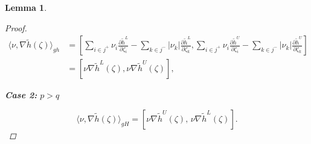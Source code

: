 \documentclass[12pt, reqno]{amsart}
\newtheorem{lemma}{Lemma}[section]
\theoremstyle{definition}
\theoremstyle{remark}
\numberwithin{equation}{section}
\begin{document}
\begin{lemma}
\begin{proof}
\begin{equation*}
    \begin{aligned}
        \langle \mathit{\nu}, \nabla\tilde{h}(\mathit{\zeta}) \rangle_{gh}
&= \left[
\sum_{i \in j^+} \mathit{\nu}_i \frac{\partial \tilde{h}^L}{\partial \mathit{\zeta}_i} - \sum_{k \in j^-} |\mathit{\nu}_k| \frac{\partial \tilde{h}^L}{\partial \mathit{\zeta}_k},\sum_{i \in j^+} \mathit{\nu}_i \frac{\partial \tilde{h}^U}{\partial \mathit{\zeta}_i} - \sum_{k \in j^-} |\mathit{\nu}_k| \frac{\partial \tilde{h}^U}{\partial \mathit{\zeta}_k}
\right]\\
&= [\mathit{\nu}\nabla\tilde{h}^L(\mathit{\zeta}),\mathit{\nu}\nabla\tilde{h}^U(\mathit{\zeta})],
    \end{aligned}
\end{equation*}

\textbf{Case 2:} \( p > q \)

\[
\langle \mathit{\nu}, \nabla\tilde{h}(\mathit{\zeta}) \rangle_{gH} = [ \mathit{\nu}\nabla\tilde{h}^U(\mathit{\zeta}),\, \mathit{\nu}\nabla\tilde{h}^L(\mathit{\zeta}) ].
\]
    
    \end{proof}
    
    
\end{lemma}
        
\end{document}
